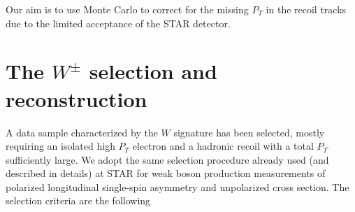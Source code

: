 \documentclass[12pt]{article}
\begin{document}
Our aim is to use Monte Carlo to correct for the missing $P_{T}$ in the recoil tracks due to
the limited acceptance of the STAR detector. 







\section{The $W^{\pm}$ selection and reconstruction}
\label{Wselection}
A data sample characterized by the $W$ signature has been selected, mostly requiring an isolated high $P_{T}$ electron and a hadronic recoil with a total $P_{T}$ sufficiently large. We adopt the same selection procedure already used (and described in details) at STAR for weak boson production measurements of polarized longitudinal single-spin asymmetry\cite{STAR_W_AL_2009-paper, STAR_W_AL_2009-note, STAR_W_AL_2012-paper, STAR_W_AL_2012-note} and unpolarized cross section\cite{STAR_W_xSec_2009-paper,STAR_W_xSec_2009-note}. The selection criteria are the following
\end{document}
